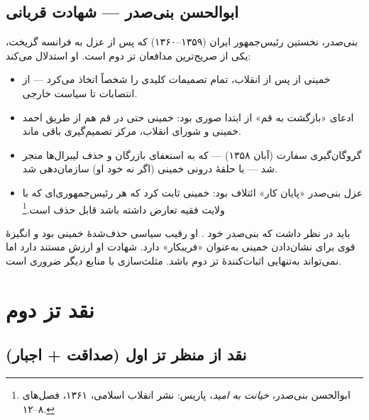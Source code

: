 \subsection{ابوالحسن بنی‌صدر — شهادت قربانی}

بنی‌صدر، نخستین رئیس‌جمهور ایران (۱۳۵۹–۱۳۶۰) که پس از عزل به فرانسه گریخت، یکی از صریح‌ترین مدافعان تز دوم است. او استدلال می‌کند:

\begin{itemize}[label=\textcolor{cAccent}{$\blacktriangleright$}, rightmargin=2em]
    \item خمینی از  پس از انقلاب، تمام تصمیمات کلیدی را شخصاً اتخاذ می‌کرد — از انتصابات تا سیاست خارجی.
    \item ادعای «بازگشت به قم» از ابتدا صوری بود: خمینی حتی در قم هم از طریق احمد خمینی و شورای انقلاب، مرکز تصمیم‌گیری باقی ماند.
    \item گروگان‌گیری سفارت (آبان ۱۳۵۸) — که به استعفای بازرگان و حذف لیبرال‌ها منجر شد — با  حلقهٔ درونی خمینی (اگر نه خود او) سازمان‌دهی شد.
    \item عزل بنی‌صدر «پایان کار» ائتلاف بود: خمینی ثابت کرد که هر رئیس‌جمهوری‌ای که با ولایت فقیه تعارض داشته باشد قابل حذف است.\footnote{ابوالحسن بنی‌صدر، \textit{خیانت به امید}، پاریس: نشر انقلاب اسلامی، ۱۳۶۱، فصل‌های ۸–۱۲.}
\end{itemize}

\begin{warningBox}
باید در نظر داشت که بنی‌صدر خود . او رقیب سیاسی حذف‌شدهٔ خمینی بود و انگیزهٔ قوی برای نشان‌دادن خمینی به‌عنوان «فریبکار» دارد. شهادت او ارزش مستند دارد اما نمی‌تواند به‌تنهایی اثبات‌کنندهٔ تز دوم باشد. مثلث‌سازی با منابع دیگر ضروری است.
\end{warningBox}

\section{نقد تز دوم}

\subsection{نقد از منظر تز اول (صداقت + اجبار)}

